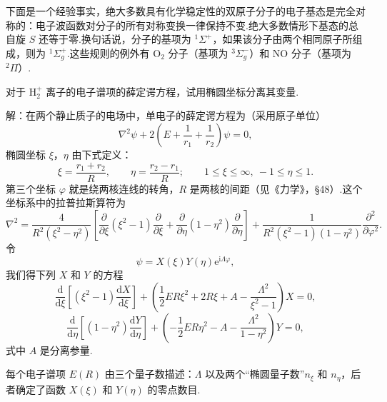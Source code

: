 下面是一个经验事实，绝大多数具有化学稳定性的双原子分子的电子基态是完全对称的：电子波函数对分子的所有对称变换一律保持不变.绝大多数情形下基态的总自旋 $S$ 还等于零.换句话说，分子的基项为 $^1\Sigma^+$，如果该分子由两个相同原子所组成，则为 $^1\Sigma_g^+$.这些规则的例外有 $\mathrm{O}_2$ 分子（基项为 $^3\Sigma_g^-$）和 NO 分子（基项为 $^2\Pi$）.

\begin{xiti}

对于 $\mathrm{H}_2^+$ 离子的电子谱项的薛定谔方程，试用椭圆坐标分离其变量.

解：在两个静止质子的电场中，单电子的薛定谔方程为（采用原子单位）
\begin{equation*}
  \nabla^2\psi+2\left(E+\frac{1}{r_1}+\frac{1}{r_2}\right)\psi=0,
\end{equation*}
椭圆坐标 $\xi$，$\eta$ 由下式定义：
\begin{equation*}
  \xi=\frac{r_1+r_2}{R},\qquad\eta=\frac{r_2-r_1}{R};\qquad
  1\leqslant\xi\leqslant\infty,\ -1\leqslant\eta\leqslant1.
\end{equation*}
第三个坐标 $\varphi$ 就是绕两核连线的转角，$R$ 是两核的间距（见《力学》，§48）.这个坐标系中的拉普拉斯算符为
\begin{equation*}
  \nabla^2=\frac{4}{R^2(\xi^2-\eta^2)}
  \left[\frac{\partial}{\partial\xi}(\xi^2-1)\frac{\partial}{\partial\xi}
  +\frac{\partial}{\partial\eta}(1-\eta^2)\frac{\partial}{\partial\eta}\right]
  +\frac{1}{R^2(\xi^2-1)(1-\eta^2)}\frac{\partial^2}{\partial\varphi^2}.
\end{equation*}
令
\begin{equation*}
  \psi=X(\xi)Y(\eta)\mathrm{e}^{\mathrm{i}\Lambda\varphi},
\end{equation*}
我们得下列 $X$ 和 $Y$ 的方程
\begin{equation*}
  \frac{\mathrm{d}}{\mathrm{d}\xi}\left[(\xi^2-1)\frac{\mathrm{d}X}{\mathrm{d}\xi}\right]
  +\left(\frac{1}{2}ER\xi^2+2R\xi+A-\frac{\Lambda^2}{\xi^2-1}\right)X=0,
\end{equation*}
\begin{equation*}
  \frac{\mathrm{d}}{\mathrm{d}\eta}\left[(1-\eta^2)\frac{\mathrm{d}Y}{\mathrm{d}\eta}\right]
  +\left(-\frac{1}{2}ER\eta^2-A-\frac{\Lambda^2}{1-\eta^2}\right)Y=0,
\end{equation*}
式中 $A$ 是分离参量.

每个电子谱项 $E(R)$ 由三个量子数描述：$\Lambda$ 以及两个“椭圆量子数”$n_\xi$ 和 $n_\eta$，后者确定了函数 $X(\xi)$ 和 $Y(\eta)$ 的零点数目.

\end{xiti}


